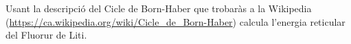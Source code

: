 \begin{exr}{}
Usant la descripció del Cicle de Born-Haber que trobaràs a la Wikipedia (\url{https://ca.wikipedia.org/wiki/Cicle_de_Born-Haber}) calcula l'energia reticular del Fluorur de Liti.
\end{exr}

